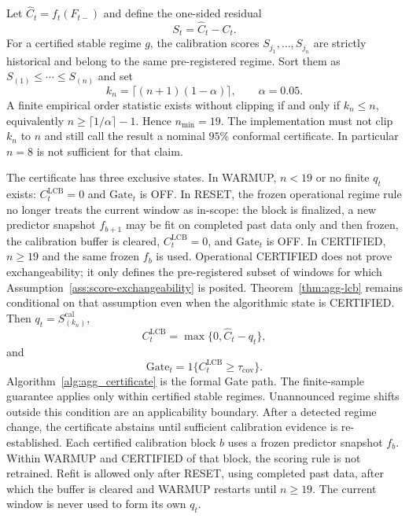 \documentclass[letterpaper,journal]{IEEEtran}
\begin{document}
Let $\widehat C_t=f_t(F_{t-})$ and define the one-sided residual
\begin{equation}
 S_t=\widehat C_t-C_t.
 \label{eq:agg_St}
\end{equation}
For a certified stable regime $g$, the calibration scores
$S_{j_1},\ldots,S_{j_n}$ are strictly historical and belong to the same
pre-registered regime.  Sort them as $S_{(1)}\le\cdots\le S_{(n)}$ and set
\begin{equation}
 k_n=\lceil(n+1)(1-\alpha)\rceil,
 \qquad
 \alpha=0.05.
 \label{eq:agg_kn}
\end{equation}
A finite empirical order statistic exists without clipping if and only if
$k_n\le n$, equivalently $n\ge\lceil 1/\alpha\rceil-1$.  Hence
$n_{\min}=19$.  The implementation must not clip $k_n$ to $n$ and still call
the result a nominal $95\%$ conformal certificate.  In particular $n=8$ is
not sufficient for that claim.

The certificate has three exclusive states.  In WARMUP, $n<19$ or no
finite $q_t$ exists: $C^{\mathrm{LCB}}_t=0$ and $\mathrm{Gate}_t$ is OFF.
In RESET, the frozen operational regime rule no longer treats the current
window as in-scope: the block is finalized, a new predictor snapshot
$f_{b+1}$ may be fit on completed past data only and then frozen, the
calibration buffer is cleared, $C^{\mathrm{LCB}}_t=0$, and
$\mathrm{Gate}_t$ is OFF.  In CERTIFIED, $n\ge 19$ and the same frozen
$f_b$ is used.  Operational CERTIFIED does not prove exchangeability; it
only defines the pre-registered subset of windows for which
Assumption~\ref{ass:score-exchangeability} is posited.
Theorem~\ref{thm:agg-lcb} remains conditional on that assumption even when
the algorithmic state is CERTIFIED.  Then $q_t=S_{(k_n)}^{\mathrm{cal}}$,
\begin{equation}
 C^{\mathrm{LCB}}_t=\max\{0,\widehat C_t-q_t\},
 \label{eq:agg_CLCB}
\end{equation}
and
\begin{equation}
 \mathrm{Gate}_t=1\{C^{\mathrm{LCB}}_t\ge\tau_{\mathrm{cov}}\}.
 \label{eq:agg_Gate}
\end{equation}
Algorithm~\ref{alg:agg_certificate} is the formal Gate path.  The finite-sample
guarantee applies only within certified stable regimes.  Unannounced regime
shifts outside this condition are an applicability boundary.  After a detected
regime change, the certificate abstains until sufficient calibration evidence
is re-established.  Each certified calibration block $b$ uses a frozen
predictor snapshot $f_b$.  Within WARMUP and CERTIFIED of that block, the
scoring rule is not retrained.  Refit is allowed only after RESET, using
completed past data, after which the buffer is cleared and WARMUP restarts
until $n\ge 19$.  The current window is never used to form its own $q_t$.
\end{document}
